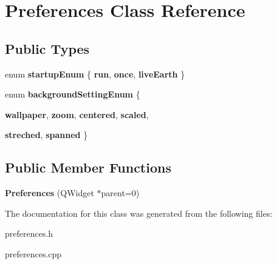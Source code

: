 \hypertarget{classPreferences}{
\section{Preferences Class Reference}
\label{classPreferences}
}
\subsection*{Public Types}
\begin{DoxyCompactItemize}
\item 
enum {\bfseries startupEnum} \{ {\bfseries run}, 
{\bfseries once}, 
{\bfseries liveEarth}
 \}
\item 
enum {\bfseries backgroundSettingEnum} \{ \par
{\bfseries wallpaper}, 
{\bfseries zoom}, 
{\bfseries centered}, 
{\bfseries scaled}, 
\par
{\bfseries streched}, 
{\bfseries spanned}
 \}
\end{DoxyCompactItemize}
\subsection*{Public Member Functions}
\begin{DoxyCompactItemize}
\item 
\hypertarget{classPreferences_a3fc460c1a11115945b78b2d35d7ade00}{
{\bfseries Preferences} (QWidget $\ast$parent=0)}
\label{classPreferences_a3fc460c1a11115945b78b2d35d7ade00}

\end{DoxyCompactItemize}


The documentation for this class was generated from the following files:\begin{DoxyCompactItemize}
\item 
preferences.h\item 
preferences.cpp\end{DoxyCompactItemize}
